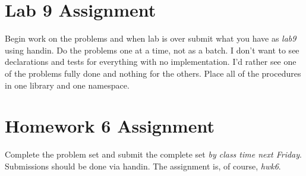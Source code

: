 \documentclass[]{tufte-handout}
\begin{document}
\section{Lab 9 Assignment}

Begin work on the problems and when lab is over submit what you have as \textit{lab9} using handin. Do the problems one at a time, not as a batch. I don't want to see declarations and tests for everything with no implementation. I'd rather see one of the problems fully done and nothing for the others. Place all of the procedures in one library and one namespace. 

\section{Homework 6 Assignment}

Complete the problem set and submit the complete set \textit{by class time next Friday}. Submissions should be done via handin. The assignment is, of course, \textit{hwk6}.
\end{document}

